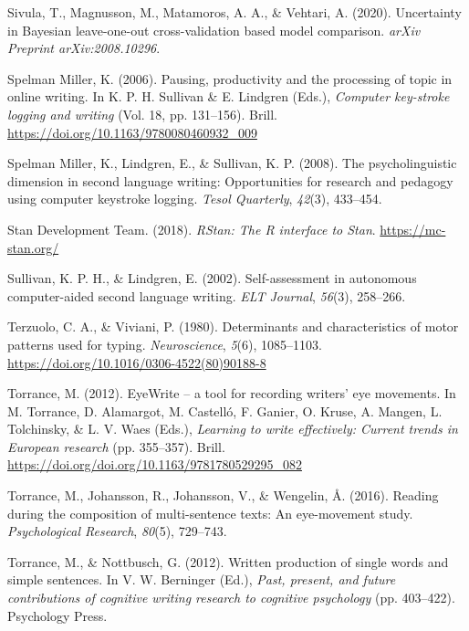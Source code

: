 \documentclass[
  man,floatsintext]{apa7}
\newlength{\cslhangindent}
\newlength{\cslentryspacingunit} %
\newenvironment{CSLReferences}[2] %
 {%
  \setlength{\parindent}{0pt}
  \ifodd #1
  \let\oldpar\par
  \def\par{\hangindent=\cslhangindent\oldpar}
  \fi
  \setlength{\parskip}{#2\cslentryspacingunit}
 }%
 {}
\begin{document}
\begin{CSLReferences}{1}{0}
\leavevmode{}%
Sivula, T., Magnusson, M., Matamoros, A. A., \& Vehtari, A. (2020). Uncertainty in {B}ayesian leave-one-out cross-validation based model comparison. \emph{arXiv Preprint arXiv:2008.10296}.

\leavevmode{}%
Spelman Miller, K. (2006). Pausing, productivity and the processing of topic in online writing. In K. P. H. Sullivan \& E. Lindgren (Eds.), \emph{Computer key-stroke logging and writing} (Vol. 18, pp. 131--156). Brill. \url{https://doi.org/10.1163/9780080460932_009}

\leavevmode{}%
Spelman Miller, K., Lindgren, E., \& Sullivan, K. P. (2008). The psycholinguistic dimension in second language writing: Opportunities for research and pedagogy using computer keystroke logging. \emph{Tesol Quarterly}, \emph{42}(3), 433--454.

\leavevmode{}%
Stan Development Team. (2018). \emph{{RStan}: The {R} interface to {Stan}}. \url{https://mc-stan.org/}

\leavevmode{}%
Sullivan, K. P. H., \& Lindgren, E. (2002). Self-assessment in autonomous computer-aided second language writing. \emph{ELT Journal}, \emph{56}(3), 258--266.

\leavevmode{}%
Terzuolo, C. A., \& Viviani, P. (1980). Determinants and characteristics of motor patterns used for typing. \emph{Neuroscience}, \emph{5}(6), 1085--1103. \url{https://doi.org/10.1016/0306-4522(80)90188-8}

\leavevmode{}%
Torrance, M. (2012). EyeWrite -- a tool for recording writers' eye movements. In M. Torrance, D. Alamargot, M. Castelló, F. Ganier, O. Kruse, A. Mangen, L. Tolchinsky, \& L. V. Waes (Eds.), \emph{Learning to write effectively: Current trends in {E}uropean research} (pp. 355--357). Brill. \url{https://doi.org/doi.org/10.1163/9781780529295_082}

\leavevmode{}%
Torrance, M., Johansson, R., Johansson, V., \& Wengelin, Å. (2016). Reading during the composition of multi-sentence texts: An eye-movement study. \emph{Psychological Research}, \emph{80}(5), 729--743.

\leavevmode{}%
Torrance, M., \& Nottbusch, G. (2012). Written production of single words and simple sentences. In V. W. Berninger (Ed.), \emph{Past, present, and future contributions of cognitive writing research to cognitive psychology} (pp. 403--422). Psychology Press.


\end{CSLReferences}
\end{document}
